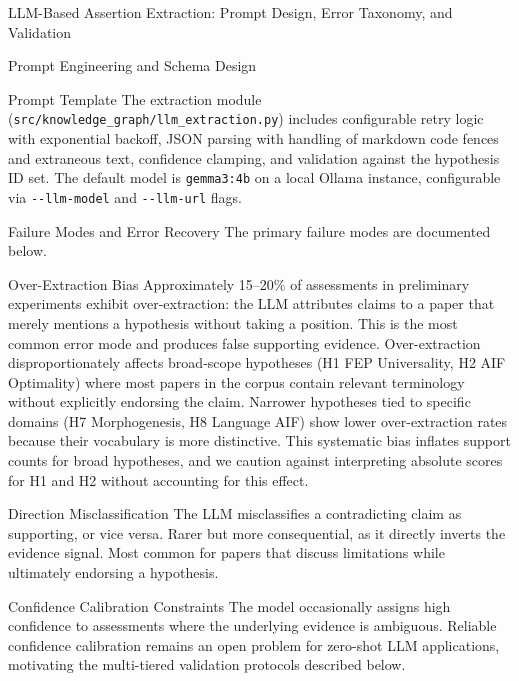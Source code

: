 \documentclass[
  ignorenonframetext,
]{beamer}
\begin{document}
\begin{frame}[fragile]{LLM-Based Assertion Extraction: Prompt Design,
Error Taxonomy, and Validation \label{sec:extraction_pipeline}}
\begin{block}{Prompt Engineering and Schema Design}
\begin{block}{Prompt Template}
The extraction module (\texttt{src/knowledge\_graph/llm\_extraction.py})
includes configurable retry logic with exponential backoff, JSON parsing
with handling of markdown code fences and extraneous text, confidence
clamping, and validation against the hypothesis ID set. The default
model is \texttt{gemma3:4b} on a local Ollama instance, configurable via
\texttt{-\/-llm-model} and \texttt{-\/-llm-url} flags.
\end{block}
\end{block}

\begin{block}{Failure Modes and Error Recovery}
\protect{}\label{failure-modes-and-error-recovery}
The primary failure modes are documented below.

\begin{block}{Over-Extraction Bias}
\protect{}\label{over-extraction-bias}
Approximately 15--20\% of assessments in preliminary experiments exhibit
over-extraction: the LLM attributes claims to a paper that merely
mentions a hypothesis without taking a position. This is the most common
error mode and produces false supporting evidence. Over-extraction
disproportionately affects broad-scope hypotheses (H1 FEP Universality,
H2 AIF Optimality) where most papers in the corpus contain relevant
terminology without explicitly endorsing the claim. Narrower hypotheses
tied to specific domains (H7 Morphogenesis, H8 Language AIF) show lower
over-extraction rates because their vocabulary is more distinctive. This
systematic bias inflates support counts for broad hypotheses, and we
caution against interpreting absolute scores for H1 and H2 without
accounting for this effect.
\end{block}

\begin{block}{Direction Misclassification}
\protect{}\label{direction-misclassification}
The LLM misclassifies a contradicting claim as supporting, or vice
versa. Rarer but more consequential, as it directly inverts the evidence
signal. Most common for papers that discuss limitations while ultimately
endorsing a hypothesis.
\end{block}

\begin{block}{Confidence Calibration Constraints}
\protect{}\label{confidence-calibration-constraints}
The model occasionally assigns high confidence to assessments where the
underlying evidence is ambiguous. Reliable confidence calibration
remains an open problem for zero-shot LLM applications, motivating the
multi-tiered validation protocols described below.
\end{block}


\end{block}
\end{frame}
\end{document}
